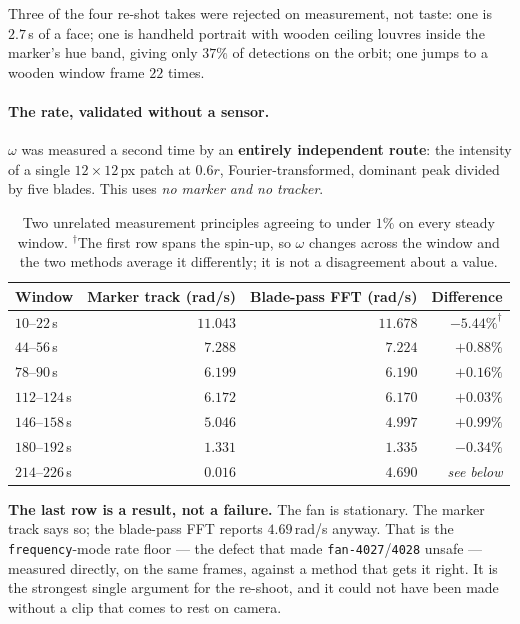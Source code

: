 \documentclass[11pt,a4paper]{article}
\begin{document}
Three of the four re-shot takes were rejected on measurement, not taste: one is $2.7$\,s of a
face; one is handheld portrait with wooden ceiling louvres inside the marker's hue band, giving
only $37\%$ of detections on the orbit; one jumps to a wooden window frame $22$ times.

\paragraph{The rate, validated without a sensor.} $\omega$ was measured a second time by an
\textbf{entirely independent route}: the intensity of a single $12\times12$\,px patch at $0.6r$,
Fourier-transformed, dominant peak divided by five blades. This uses \emph{no marker and no
tracker}.

\begin{table}[htbp]
\centering
\footnotesize
\begin{tabular}{lrrr}
\toprule
Window & Marker track (rad/s) & Blade-pass FFT (rad/s) & Difference \\
\midrule
$10$--$22$\,s  & $11.043$ & $11.678$ & $-5.44\%^\dag$ \\
$44$--$56$\,s  & $7.288$  & $7.224$  & $+0.88\%$ \\
$78$--$90$\,s  & $6.199$  & $6.190$  & $\mathbf{+0.16\%}$ \\
$112$--$124$\,s & $6.172$ & $6.170$  & $\mathbf{+0.03\%}$ \\
$146$--$158$\,s & $5.046$ & $4.997$  & $+0.99\%$ \\
$180$--$192$\,s & $1.331$ & $1.335$  & $-0.34\%$ \\
\midrule
$214$--$226$\,s & $\mathbf{0.016}$ & $\mathbf{4.690}$ & \emph{see below} \\
\bottomrule
\end{tabular}
\caption{Two unrelated measurement principles agreeing to under $1\%$ on every steady window.
$^\dag$The first row spans the spin-up, so $\omega$ changes across the window and the two methods
average it differently; it is not a disagreement about a value.}
\label{tab:bladepass}
\end{table}

\textbf{The last row is a result, not a failure.} The fan is stationary. The marker track says so;
the blade-pass FFT reports $4.69$\,rad/s anyway. That is the \texttt{frequency}-mode rate floor
--- the defect that made \texttt{fan-4027}/\texttt{4028} unsafe --- measured directly, on the same
frames, against a method that gets it right. It is the strongest single argument for the re-shoot,
and it could not have been made without a clip that comes to rest on camera.
\end{document}
